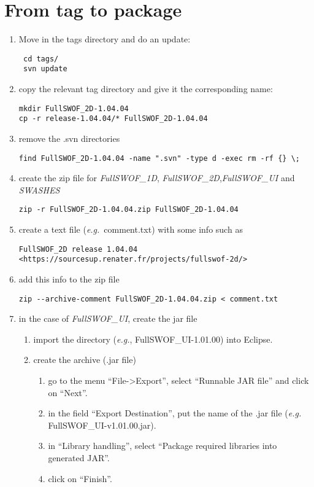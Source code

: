 \documentclass[a4paper, 11pt]{article}
\newcommand{\FullSWOFoneD}{\emph{FullSWOF\_1D}}
\newcommand{\FullSWOFtwoD}{\emph{FullSWOF\_2D}}
\newcommand{\FullSWOFUI}{\emph{FullSWOF\_UI}}
\newcommand{\SWASHES}{\emph{SWASHES}}
\begin{document}
\section{From tag to package}

\begin{enumerate}
\item Move in the tags directory and do an update:
\begin{verbatim}
 cd tags/
 svn update
\end{verbatim}
\item copy the relevant tag directory and give it the corresponding name:
\begin{verbatim}
mkdir FullSWOF_2D-1.04.04
cp -r release-1.04.04/* FullSWOF_2D-1.04.04
\end{verbatim}
\item remove the .svn directories
\begin{verbatim}
find FullSWOF_2D-1.04.04 -name ".svn" -type d -exec rm -rf {} \;
\end{verbatim}

\item create the zip file for \FullSWOFoneD, \FullSWOFtwoD{},\FullSWOFUI{} and \SWASHES{}
\begin{verbatim}
zip -r FullSWOF_2D-1.04.04.zip FullSWOF_2D-1.04.04
\end{verbatim}
\item create a text file (\emph{e.g.}~comment.txt) with some info such as 
\begin{verbatim}
FullSWOF_2D release 1.04.04
<https://sourcesup.renater.fr/projects/fullswof-2d/>
\end{verbatim}
\item add this info to the zip file
\begin{verbatim}
zip --archive-comment FullSWOF_2D-1.04.04.zip < comment.txt
\end{verbatim}

\color[gray]{0.4}
\item in the case of \FullSWOFUI{}, create the jar file 

\begin{enumerate}
 
\item import the directory (\emph{e.g.}, FullSWOF\_UI-1.01.00) into Eclipse.
\item create the archive (.jar file)

\begin{enumerate}
\item go to the menu ``File->Export'', select ``Runnable JAR file'' and click on ``Next''.
\item in the field ``Export Destination'', put the name of the .jar file (\emph{e.g.} FullSWOF\_UI-v1.01.00.jar).
\item in ``Library handling'', select ``Package required libraries into generated JAR''.
\item click on ``Finish''.
\end{enumerate}


\end{enumerate}
\end{enumerate}
\end{document}
